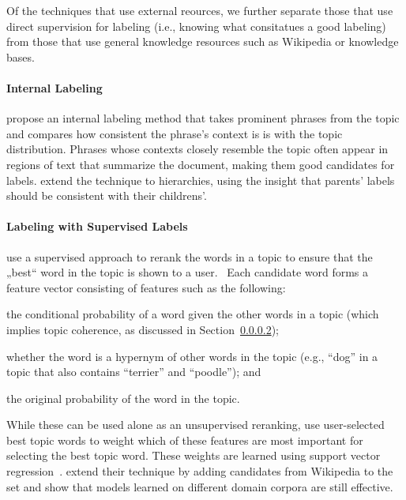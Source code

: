 Of the techniques that use external reources, we further separate
those that use direct supervision for labeling (i.e., knowing what
consitatues a good labeling) from those that use general knowledge
resources such as Wikipedia or knowledge bases.

\paragraph{Internal Labeling} 

\citet{mei-07} propose an internal labeling method that takes
prominent phrases from the topic and compares how consistent the
phrase's context is is with the topic distribution.  Phrases whose
contexts closely resemble the topic often appear in regions of text
that summarize the document, making them good candidates for labels.
\cite{mao-12} extend the technique to hierarchies, using the insight
that parents’ labels should be consistent with their childrens'.



\paragraph{Labeling with Supervised Labels}

\citet{lau-10} use a supervised approach to rerank the words in a
topic to ensure that the „best“ word in the topic is shown to a
user.  Each candidate word forms a feature vector consisting of
features such as the following:
\begin{itemize*}
\item the conditional probability of a word given the other words in a
  topic (which implies topic coherence, as discussed in Section~\ref{});
\item whether the word is a hypernym of other words in the topic
  (e.g., ``dog'' in a topic that also contains ``terrier'' and
  ``poodle''); and
\item the original probability of the word in the topic.
\end{itemize*}

While these can be used alone as an unsupervised reranking,
\citet{lau-10} use user-selected best topic words to weight which of
these features are most important for selecting the best topic word.
These weights are learned using support vector regression~\cite{}.
\citet{lau-11} extend their technique by adding candidates from
Wikipedia to the set and show that models learned on different domain
corpora are still effective.

